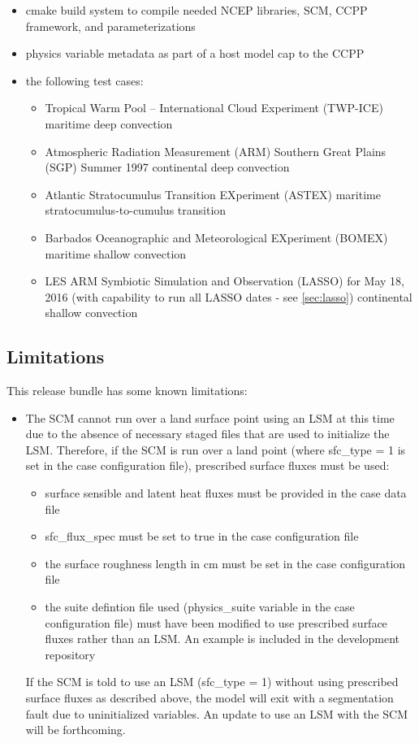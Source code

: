 \begin{itemize}
\item cmake build system to compile needed NCEP libraries, SCM, CCPP framework, and parameterizations
\item physics variable metadata as part of a host model cap to the CCPP
\item the following test cases:
\begin{itemize}
\item Tropical Warm Pool -- International Cloud Experiment (TWP-ICE) maritime deep convection
\item Atmospheric Radiation Measurement (ARM) Southern Great Plains (SGP) Summer 1997 continental deep convection
\item Atlantic Stratocumulus Transition EXperiment (ASTEX) maritime stratocumulus-to-cumulus transition
\item Barbados Oceanographic and Meteorological EXperiment (BOMEX) maritime shallow convection
\item LES ARM Symbiotic Simulation and Observation (LASSO) for May 18, 2016 (with capability to run all LASSO dates - see \ref{sec:lasso}) continental shallow convection
\end{itemize}
\end{itemize}

\subsection{Limitations}

This release bundle has some known limitations:

\begin{itemize}
\item The SCM cannot run over a land surface point using an LSM at this time due to the absence of necessary staged files that are used to initialize the LSM. Therefore, if the SCM is run over a land point (where sfc\_type = 1 is set in the case configuration file), prescribed surface fluxes must be used:
\begin{itemize}
\item surface sensible and latent heat fluxes must be provided in the case data file
\item sfc\_flux\_spec must be set to true in the case configuration file
\item the surface roughness length in cm must be set in the case configuration file
\item the suite defintion file used (physics\_suite variable in the case configuration file) must have been modified to use prescribed surface fluxes rather than an LSM. An example is included in the development repository
\end{itemize}
If the SCM is told to use an LSM (sfc\_type = 1) without using prescribed surface fluxes as described above, the model will exit with a segmentation fault due to uninitialized variables. An update to use an LSM with the SCM will be forthcoming.
\end{itemize}
